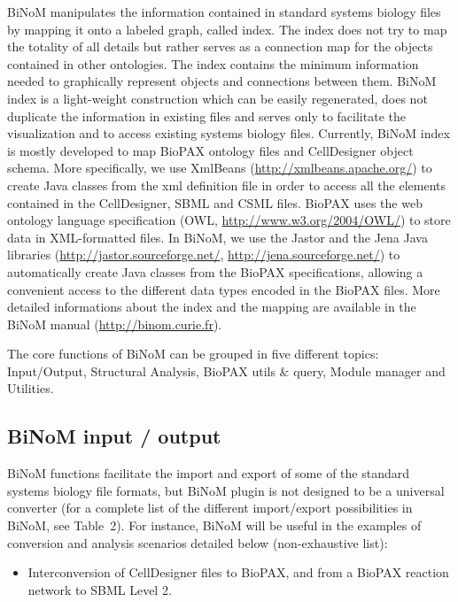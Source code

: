 \documentclass[11pt]{bmc_article_s50}
\newenvironment{bmcformat}{\begin{raggedright}\baselineskip20pt\sloppy\setboolean{publ}{false}}{\end{raggedright}\baselineskip20pt\sloppy}
\begin{document}
\begin{bmcformat}
BiNoM manipulates the information contained in standard systems biology
files by mapping it onto a labeled graph, called index. The index does not try
to map the totality of all details but rather serves as a connection map for the
objects contained in other ontologies. The index contains the minimum
information needed to graphically represent objects and connections between
them. BiNoM index is a light-weight construction which can be easily
regenerated, does not duplicate the information in existing files and serves
only to facilitate the visualization and to access existing systems biology
files. Currently, BiNoM index is mostly developed to map BioPAX ontology files
and CellDesigner object schema. More specifically, we use XmlBeans
(\url{http://xmlbeans.apache.org/}) to create Java classes from the xml definition file in
order to access all the elements contained in the CellDesigner, SBML and CSML files.
BioPAX uses the web ontology language specification (OWL,
\url{http://www.w3.org/2004/OWL/}) to store data in XML-formatted files. In
BiNoM, we use the Jastor and the Jena Java libraries
(\url{http://jastor.sourceforge.net/}, \url{http://jena.sourceforge.net/}) to
automatically create Java classes from the BioPAX specifications, allowing a
convenient access to the different data types encoded in the BioPAX files. More
detailed informations about the index and the mapping are available in the BiNoM
manual (\url{http://binom.curie.fr}).

The core functions of BiNoM can be grouped in five different topics: Input/Output,
Structural Analysis, BioPAX utils \& query, Module manager and Utilities.

\vspace{-5pt}

\subsection*{BiNoM input / output}

BiNoM functions facilitate the import and export of some of the standard systems
biology file formats, but BiNoM plugin is not designed to be a universal
converter (for a complete list of the different import/export possibilities in
BiNoM, see Table~2).
For instance, BiNoM will be useful in the examples of conversion and analysis
scenarios detailed below (non-exhaustive list):

\begin{itemize}

\item Interconversion of CellDesigner files to BioPAX, and from a BioPAX
reaction network to SBML Level 2.


\end{itemize}
\end{bmcformat}
\end{document}
